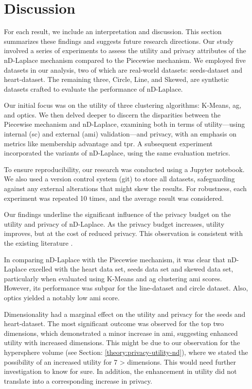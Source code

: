 \chapter{Discussion}
For each result, we include an interpretation and discussion. This section summarizes these findings and suggests future research directions.
Our study involved a series of experiments to assess the utility and privacy attributes of the nD-Laplace mechanism compared to the Piecewise mechanism. We employed five datasets in our analysis, two of which are real-world datasets: seeds-dataset and heart-dataset. The remaining three, Circle, Line, and Skewed, are synthetic datasets crafted to evaluate the performance of nD-Laplace.

Our initial focus was on the utility of three clustering algorithms: K-Means, \gls{ag}, and \gls{optics}. We then delved deeper to discern the disparities between the Piecewise mechanism and nD-Laplace, examining both in terms of utility—using internal (\gls{sc}) and external (\gls{ami}) validation—and privacy, with an emphasis on metrics like membership advantage and \gls{tpr}. A subsequent experiment incorporated the variants of nD-Laplace, using the same evaluation metrics.

To ensure reproducibility, our research was conducted using a Jupyter notebook. We also used a version control system (git) to store all datasets, safeguarding against any external alterations that might skew the results. For robustness, each experiment was repeated 10 times, and the average result was considered. 

Our findings underline the significant influence of the privacy budget on the utility and privacy of nD-Laplace. As the privacy budget increases, utility improves, but at the cost of reduced privacy. This observation is consistent with the existing literature \citep{sun_distributed_2019, xia_distributed_2020, 9679364}. \newline

In comparing nD-Laplace with the Piecewise mechanism, it was clear that nD-Laplace excelled with the heart data set, seeds data set and skewed data set, particularly when evaluated using K-Means and \gls{ag} clustering \gls{ami} scores. However, its performance was subpar for the line-dataset and circle dataset. Also, \gls{optics} yielded a notably low \gls{ami} score.

Dimensionality had a marginal effect on the utility and privacy for the seeds and heart-dataset. The most significant outcome was observed for the top two dimensions, which demonstrated a minor increase in \gls{ami}, suggesting enhanced utility with increased dimensions.  This might be due to our observation for the hypersphere volume (see Section: \ref{theory:privacy-utility-nd}), where we stated the possibility of an increased utility for 7 > dimensions. This would need further investigation to know for sure.
In addition, the enhancement in utility did not translate into a corresponding increase in privacy. \newpage

